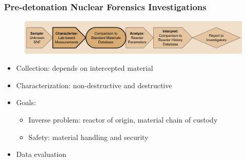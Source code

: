 
\begin{frame}
  \frametitle{Pre-detonation Nuclear Forensics Investigations}
  \begin{adjustwidth}{-15pt}{-15pt}
  \begin{figure}
    \centering
    \includegraphics[width=1.1\textwidth]{./figures/forensicsrealworld.png}
  \end{figure}
  \vspace{6mm}
  \hspace{10mm}
  \begin{minipage}{0.85\linewidth}
    \begin{itemize}
      \item<1-> Collection: depends on intercepted material
      \item<2-> Characterization: non-destructive and destructive
      \item<3-> Goals:
      \begin{itemize}
        \item Inverse problem: reactor of origin, material chain of custody
        \item Safety: material handling and security
      \end{itemize}
      \item<4-> Data evaluation
    \end{itemize}
  \end{minipage}
  \end{adjustwidth}
\end{frame}

